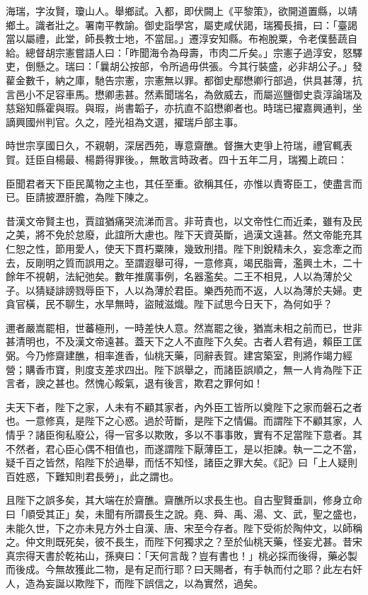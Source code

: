 
\begin{pinyinscope}
海瑞，字汝賢，瓊山人。舉鄉試。入都，即伏闕上《平黎策》，欲開道置縣，以靖鄉土。識者壯之。署南平教諭。御史詣學宮，屬吏咸伏謁，瑞獨長揖，曰：「臺謁當以屬禮，此堂，師長教士地，不當屈。」遷淳安知縣。布袍脫粟，令老僕藝蔬自給。總督胡宗憲嘗語人曰：「昨聞海令為母壽，市肉二斤矣。」宗憲子過淳安，怒驛吏，倒懸之。瑞曰：「曩胡公按部，令所過毋供張。今其行裝盛，必非胡公子。」發雚金數千，納之庫，馳告宗憲，宗憲無以罪。都御史鄢懋卿行部過，供具甚薄，抗言邑小不足容車馬。懋卿恚甚。然素聞瑞名，為斂威去，而屬巡鹽御史袁淳論瑞及慈谿知縣霍與瑕。與瑕，尚書韜子，亦抗直不諂懋卿者也。時瑞已擢嘉興通判，坐謫興國州判官。久之，陸光祖為文選，擢瑞戶部主事。

時世宗享國日久，不親朝，深居西苑，專意齋醮。督撫大吏爭上符瑞，禮官輒表賀。廷臣自楊最、楊爵得罪後。，無敢言時政者。四十五年二月，瑞獨上疏曰：

臣聞君者天下臣民萬物之主也，其任至重。欲稱其任，亦惟以責寄臣工，使盡言而已。臣請披瀝肝膽，為陛下陳之。

昔漢文帝賢主也，賈誼猶痛哭流涕而言。非苛責也，以文帝性仁而近柔，雖有及民之美，將不免於怠廢，此誼所大慮也。陛下天資英斷，過漢文遠甚。然文帝能充其仁恕之性，節用愛人，使天下貫朽粟陳，幾致刑措。陛下則銳精未久，妄念牽之而去，反剛明之質而誤用之。至謂遐舉可得，一意修真，竭民脂膏，濫興土木，二十餘年不視朝，法紀弛矣。數年推廣事例，名器濫矣。二王不相見，人以為薄於父子。以猜疑誹謗戮辱臣下，人以為薄於君臣。樂西苑而不返，人以為薄於夫婦。吏貪官橫，民不聊生，水旱無時，盜賊滋熾。陛下試思今日天下，為何如乎？

邇者嚴嵩罷相，世蕃極刑，一時差快人意。然嵩罷之後，猶嵩未相之前而已，世非甚清明也，不及漢文帝遠甚。蓋天下之人不直陛下久矣。古者人君有過，賴臣工匡弼。今乃修齋建醮，相率進香，仙桃天藥，同辭表賀。建宮築室，則將作竭力經營；購香市寶，則度支差求四出。陛下誤舉之，而諸臣誤順之，無一人肯為陛下正言者，諛之甚也。然愧心餒氣，退有後言，欺君之罪何如！

夫天下者，陛下之家，人未有不顧其家者，內外臣工皆所以奠陛下之家而磐石之者也。一意修真，是陛下之心惑。過於苛斷，是陛下之情偏。而謂陛下不顧其家，人情乎？諸臣徇私廢公，得一官多以欺敗，多以不事事敗，實有不足當陛下意者。其不然者，君心臣心偶不相值也，而遂謂陛下厭薄臣工，是以拒諫。執一二之不當，疑千百之皆然，陷陛下於過舉，而恬不知怪，諸臣之罪大矣。《記》曰「上人疑則百姓惑，下難知則君長勞」，此之謂也。

且陛下之誤多矣，其大端在於齋醮。齋醮所以求長生也。自古聖賢垂訓，修身立命曰「順受其正」矣，未聞有所謂長生之說。堯、舜、禹、湯、文、武，聖之盛也，未能久世，下之亦未見方外士自漢、唐、宋至今存者。陛下受術於陶仲文，以師稱之。仲文則既死矣，彼不長生，而陛下何獨求之？至於仙桃天藥，怪妄尤甚。昔宋真宗得天書於乾祐山，孫奭曰：「天何言哉？豈有書也！」桃必採而後得，藥必製而後成。今無故獲此二物，是有足而行耶？曰天賜者，有手執而付之耶？此左右奸人，造為妄誕以欺陛下，而陛下誤信之，以為實然，過矣。


\end{pinyinscope}
